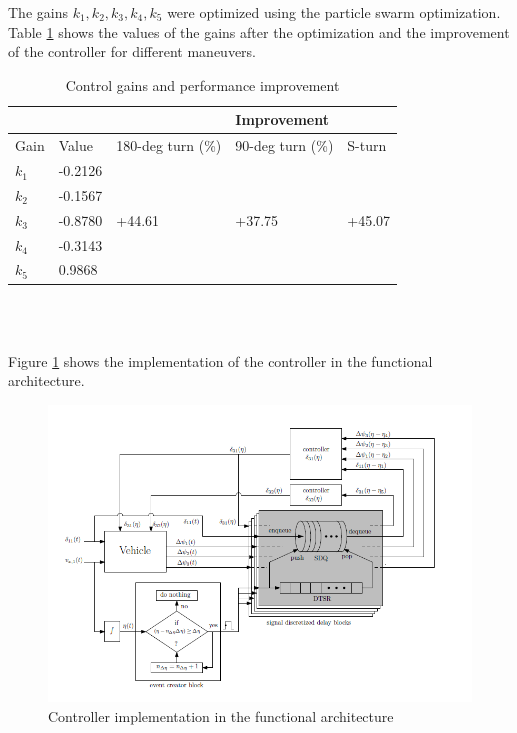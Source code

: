 \documentclass[ExampleMasters.tex]{subfiles}
\begin{document}
The gains $k_1, k_2, k_3, k_4, k_5$ were optimized using the particle swarm optimization.
Table \ref{tab:gains_after_optimization} shows the values of the gains after the optimization and the improvement of the controller for different maneuvers.
\begin{table}[h]
	\centering
	\caption{Control gains and performance improvement}
	\label{tab:gains_after_optimization}
	\begin{tabular}{l|l|l l l}
		& &  & Improvement  \\ \hline
		Gain & Value & 180-deg turn (\%) & 90-deg turn (\%) & S-turn\\ \hline
		$k_1$   &       -0.2126      &             \\
		$k_2$    &            -0.1567 &             \\
		$k_3$  &      -0.8780       &           +44.61 & +37.75 & +45.07  \\
		$k_4$ &      -0.3143       &           \\
		$k_5$  & 0.9868 & \\
		
	\end{tabular} \\
\end{table}\\
Figure \ref{fig:low_speed_diagram} shows the implementation of the controller in the functional architecture.

\begin{figure}[h]
	\centering
	\includegraphics[width=1.0\linewidth]{figures/Low_speed_diagram}
	\caption[]{Controller implementation in the functional architecture \cite{Low-speed_paper}}
	\label{fig:low_speed_diagram}
\end{figure}
\end{document}
